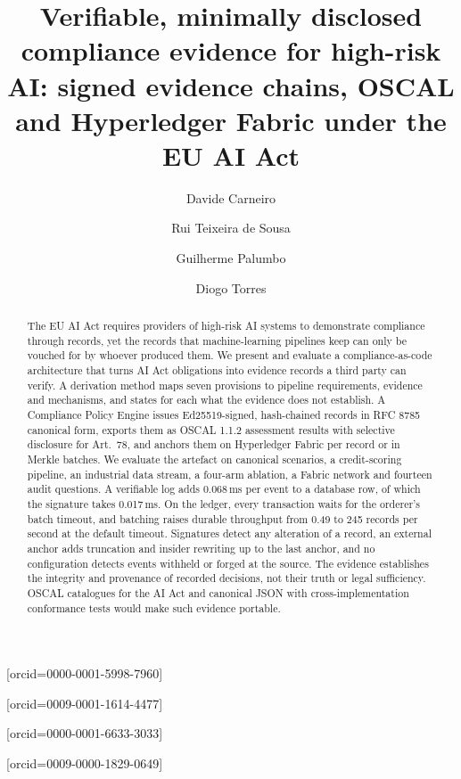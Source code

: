 \documentclass[a4paper,fleqn]{cas-dc}
\begin{document}
\let\WriteBookmarks\relax
\def\floatpagepagefraction{1}
\def\textpagefraction{.001}


\title [mode = title]{Verifiable, minimally disclosed compliance evidence for high-risk AI: signed evidence chains, OSCAL and Hyperledger Fabric under the EU AI Act}

\author[1,2]{Davide Carneiro}[orcid=0000-0001-5998-7960]
\cormark[1]

\author[3]{Rui Teixeira de Sousa}[orcid=0009-0001-1614-4477]

\author[3]{Guilherme Palumbo}[orcid=0000-0001-6633-3033]

\author[1]{Diogo Torres}[orcid=0009-0000-1829-0649]




\begin{abstract}
The EU AI Act requires providers of high-risk AI systems to demonstrate compliance through records, yet the records that machine-learning pipelines keep can only be vouched for by whoever produced them. We present and evaluate a compliance-as-code architecture that turns AI Act obligations into evidence records a third party can verify. A derivation method maps seven provisions to pipeline requirements, evidence and mechanisms, and states for each what the evidence does not establish. A Compliance Policy Engine issues Ed25519-signed, hash-chained records in RFC 8785 canonical form, exports them as OSCAL 1.1.2 assessment results with selective disclosure for Art.~78, and anchors them on Hyperledger Fabric per record or in Merkle batches. We evaluate the artefact on canonical scenarios, a credit-scoring pipeline, an industrial data stream, a four-arm ablation, a Fabric network and fourteen audit questions. A verifiable log adds 0.068\,ms per event to a database row, of which the signature takes 0.017\,ms. On the ledger, every transaction waits for the orderer's batch timeout, and batching raises durable throughput from 0.49 to 245 records per second at the default timeout. Signatures detect any alteration of a record, an external anchor adds truncation and insider rewriting up to the last anchor, and no configuration detects events withheld or forged at the source. The evidence establishes the integrity and provenance of recorded decisions, not their truth or legal sufficiency. OSCAL catalogues for the AI Act and canonical JSON with cross-implementation conformance tests would make such evidence portable.
\end{abstract}
\end{document}
